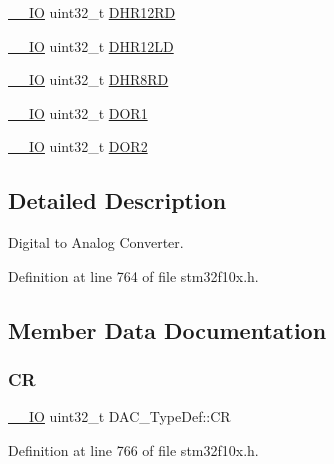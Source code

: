 \begin{DoxyCompactItemize}
\item 
\hyperlink{core__sc300_8h_aec43007d9998a0a0e01faede4133d6be}{\+\_\+\+\_\+\+IO} uint32\+\_\+t \hyperlink{struct_d_a_c___type_def_affa5cc9fe0cc9eb594d703bdc9d9abd9}{D\+H\+R12\+RD}
\item 
\hyperlink{core__sc300_8h_aec43007d9998a0a0e01faede4133d6be}{\+\_\+\+\_\+\+IO} uint32\+\_\+t \hyperlink{struct_d_a_c___type_def_aea4d055e3697999b44cdcf2702d79d40}{D\+H\+R12\+LD}
\item 
\hyperlink{core__sc300_8h_aec43007d9998a0a0e01faede4133d6be}{\+\_\+\+\_\+\+IO} uint32\+\_\+t \hyperlink{struct_d_a_c___type_def_a03f8d95bbf0ce3a53cb79506d5bf995a}{D\+H\+R8\+RD}
\item 
\hyperlink{core__sc300_8h_aec43007d9998a0a0e01faede4133d6be}{\+\_\+\+\_\+\+IO} uint32\+\_\+t \hyperlink{struct_d_a_c___type_def_a50b4f0b0d2a376f729c8d7acf47864c3}{D\+O\+R1}
\item 
\hyperlink{core__sc300_8h_aec43007d9998a0a0e01faede4133d6be}{\+\_\+\+\_\+\+IO} uint32\+\_\+t \hyperlink{struct_d_a_c___type_def_a1bde8391647d6422b39ab5ba4f13848b}{D\+O\+R2}
\end{DoxyCompactItemize}


\subsection{Detailed Description}
Digital to Analog Converter. 

Definition at line 764 of file stm32f10x.\+h.



\subsection{Member Data Documentation}
\mbox{\label{struct_d_a_c___type_def_a394324f0b573837ca15a87127b2a37ea}} 
\subsubsection{\texorpdfstring{CR}{CR}}
{\footnotesize\ttfamily \hyperlink{core__sc300_8h_aec43007d9998a0a0e01faede4133d6be}{\+\_\+\+\_\+\+IO} uint32\+\_\+t D\+A\+C\+\_\+\+Type\+Def\+::\+CR}



Definition at line 766 of file stm32f10x.\+h.

